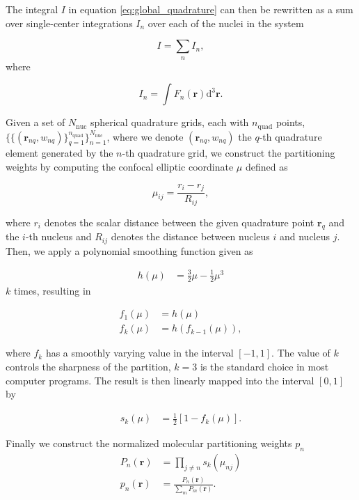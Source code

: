 \documentclass{article}
\begin{document}
The integral $I$ in equation \eqref{eq:global_quadrature} can then be
rewritten as a sum over single-center integrations $I_n$ over each of
the nuclei in the system

\begin{equation}
  I = \sum_n I_n,
  \label{eq:integral_decomposed}
\end{equation}
where

\begin{equation}
  I_n = \int F_n(\mathbf r)\mathrm d^3\mathbf r.
  \label{eq:partial-integral_definition}
\end{equation}

Given a set of $N_\text{nuc}$ spherical quadrature grids, each with
$n_\text{quad}$ points,
$\{\{(\mathbf r_{nq},
w_{nq})\}_{q=1}^{n_{\text{quad}}}\}_{n=1}^{N_{\text{nuc}}}$, where we
denote $(\mathbf r_{nq},w_{nq})$ the $q$-th quadrature element
generated by the $n$-th quadrature grid, we construct the
partitioning weights by computing the confocal elliptic coordinate
$\mu$ defined as

\begin{equation}
  \mu_{ij} = \frac{r_i - r_j}{R_{ij}},
  \label{eq:mu_ij}
\end{equation}

where $r_i$ denotes the scalar distance between the given quadrature
point $\mathbf r_q$ and the $i$-th nucleus and $R_{ij}$ denotes the
distance between nucleus $i$ and nucleus $j$. Then, we apply a
polynomial smoothing function given as

\begin{align}
  h(\mu)   &= \frac{3}{2} \mu - \frac{1}{2} \mu^3
\end{align}
$k$ times, resulting in

\begin{align}
  f_1(\mu) &= h(\mu) \\
  f_k(\mu) &= h(f_{k-1}(\mu)),
\end{align}

where $f_k$ has a smoothly varying value in the interval $[-1,1]$.
The value of $k$ controls the sharpness of the partition, $k=3$ is
the standard choice in most computer programs\cite{Becke_1988,
Franchini2013}. The result is then linearly mapped into the interval $[0,1]$ by

\begin{align}
  s_k(\mu) &= \frac{1}{2} [1-f_k(\mu)].
\end{align}

Finally we construct the normalized molecular partitioning weights $p_n$
\begin{align}
  P_n(\mathbf r) &= \prod_{j \neq n} s_k(\mu_{nj}) \\
  p_n(\mathbf r) &= \frac{P_n(\mathbf r) }{ \sum_m P_m(\mathbf r)}.
  \label{eq:partition_weight_def}
\end{align}
\end{document}
